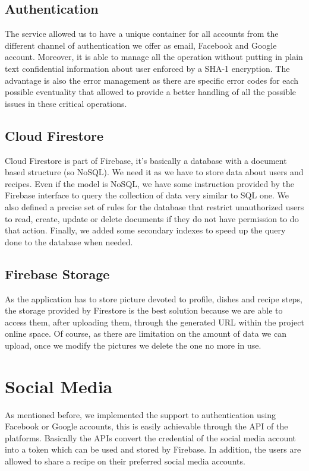 \subsection{Authentication}
The service allowed us to have a unique container for all accounts from the different channel of authentication we offer as email, Facebook and Google account. 
Moreover, it is able to manage all the operation without putting in plain text confidential information about user enforced by a SHA-1 encryption. 
The advantage is also the error management as there are specific error codes for each possible eventuality that allowed to provide a better handling of all the possible issues in these critical operations.

\subsection{Cloud Firestore}
Cloud Firestore is part of Firebase, it's basically a database with a document based structure (so NoSQL).
We need it as we have to store data about users and recipes.
Even if the model is NoSQL, we have some instruction provided by the Firebase interface to query the collection of data very similar to SQL one.
We also defined a precise set of rules for the database that restrict unauthorized users to read, create, update or delete documents if they do not have permission to do that action.
Finally, we added some secondary indexes to speed up the query done to the database when needed.

\subsection{Firebase Storage}
As the application has to store picture devoted to profile, dishes and recipe steps, the storage provided by Firestore is the best solution because we are able to access them, after uploading them, through the generated URL within the project online space. 
Of course, as there are limitation on the amount of data we can upload, once we modify the pictures we delete the one no more in use.

\section{Social Media}
As mentioned before, we implemented the support to authentication using Facebook or Google accounts, this is easily achievable through the API of the platforms.
Basically the APIs convert the credential of the social media account into a token which can be used and stored by Firebase. 
In addition, the users are allowed to share a recipe on their preferred social media accounts.
